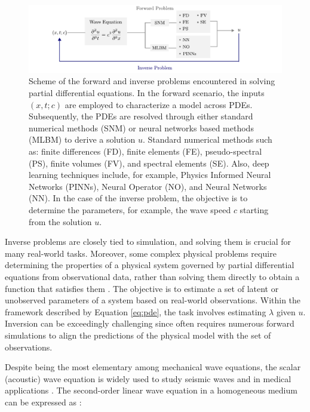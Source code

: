 \documentclass[11pt,twoside]{article}
\begin{document}
\begin{figure}[h]
\includegraphics{figs/forward_inverse_modeling_waves.pdf}
    \caption{Scheme of the forward and inverse problems encountered in solving partial differential equations. In the forward 
    scenario, the inputs $(x,t;c)$ are employed to characterize a model across PDEs. Subsequently, the PDEs are resolved through 
    either standard numerical methods (SNM) or neural networks based methods (MLBM) to derive a solution $u$. Standard numerical 
    methods such as: finite differences (FD), finite elements (FE), pseudo-spectral (PS), finite volumes (FV), and spectral 
    elements (SE). Also, deep learning techniques include, for example, Physics Informed Neural Networks (PINNs), Neural Operator 
    (NO), and Neural Networks (NN). In the case of the inverse problem, the objective is to determine the parameters, for example, 
    the wave speed $c$ starting from the solution $u$.}
    \label{fig:forward_inverse}
\end{figure}

Inverse problems are closely tied to simulation, and solving them is crucial for many real-world tasks. Moreover, some complex 
physical problems require determining the properties of a physical system governed by partial differential equations from 
observational data, rather than solving them directly to obtain a function that satisfies them 
\citep{galiounas_battery_2022, ren_seismicnet_2024,mccann_convolutional_2017}. The objective is to estimate a set of latent or 
unobserved parameters of a system based on real-world observations. Within the framework described by Equation \ref{eq:pde}, 
the task involves estimating $\lambda$ given $u$. Inversion can be exceedingly challenging since often requires numerous forward 
simulations to align the predictions of the physical model with the set of observations. 

Despite being the most elementary among mechanical wave equations, the scalar (acoustic) wave equation is widely used to study 
seismic waves and in medical applications \citep{moseley_physics-informed_2022, alkhadhr_wave_2023}. The second-order linear 
wave equation in a homogeneous medium can be expressed as \citep{Carcione2002}:
\end{document}
